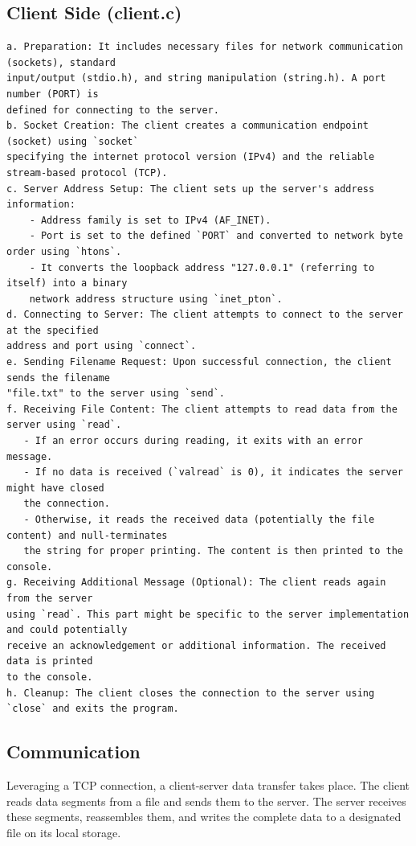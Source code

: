\documentclass{article}
\begin{document}
\subsection{Client Side (client.c)}
\begin{verbatim}
a. Preparation: It includes necessary files for network communication (sockets), standard 
input/output (stdio.h), and string manipulation (string.h). A port number (PORT) is 
defined for connecting to the server.
b. Socket Creation: The client creates a communication endpoint (socket) using `socket` 
specifying the internet protocol version (IPv4) and the reliable stream-based protocol (TCP).
c. Server Address Setup: The client sets up the server's address information:
    - Address family is set to IPv4 (AF_INET).
    - Port is set to the defined `PORT` and converted to network byte order using `htons`.
    - It converts the loopback address "127.0.0.1" (referring to itself) into a binary 
    network address structure using `inet_pton`.
d. Connecting to Server: The client attempts to connect to the server at the specified 
address and port using `connect`.
e. Sending Filename Request: Upon successful connection, the client sends the filename 
"file.txt" to the server using `send`.
f. Receiving File Content: The client attempts to read data from the server using `read`. 
   - If an error occurs during reading, it exits with an error message.
   - If no data is received (`valread` is 0), it indicates the server might have closed 
   the connection.
   - Otherwise, it reads the received data (potentially the file content) and null-terminates 
   the string for proper printing. The content is then printed to the console.
g. Receiving Additional Message (Optional): The client reads again from the server 
using `read`. This part might be specific to the server implementation and could potentially 
receive an acknowledgement or additional information. The received data is printed 
to the console.
h. Cleanup: The client closes the connection to the server using `close` and exits the program. 
\end{verbatim}

\subsection{Communication}
Leveraging a TCP connection, a client-server data transfer takes place. The client reads data segments from a file and sends them to the server. The server receives these segments, reassembles them, and writes the complete data to a designated file on its local storage.
\end{document}
